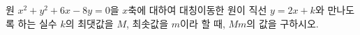 원 $x^2+y^2+6x-8y=0$을 $x$축에 대하여 대칭이동한 원이 직선 $y=2x+k$와 만나도록 하는 실수 $k$의 최댓값을 $M$, 최솟값을 $m$이라 할 때, $Mm$의 값을 구하시오.

